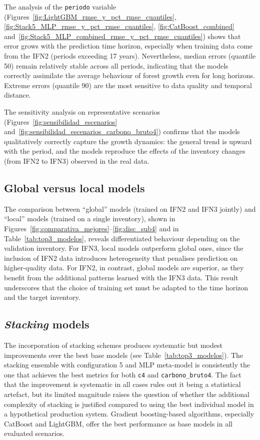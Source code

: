 The analysis of the \texttt{periodo} variable (Figures~\ref{fig:LightGBM_rmse_y_pct_rmse_cuantiles}, \ref{fig:Stack5_MLP_rmse_y_pct_rmse_cuantiles}, \ref{fig:CatBoost_combined} and~\ref{fig:Stack5_MLP_combined_rmse_y_pct_rmse_cuantiles}) shows that error grows with the prediction time horizon, especially when training data come from the IFN2 (periods exceeding 17 years). Nevertheless, median errors (quantile 50) remain relatively stable across all periods, indicating that the models correctly assimilate the average behaviour of forest growth even for long horizons. Extreme errors (quantile 90) are the most sensitive to data quality and temporal distance.

The sensitivity analysis on representative scenarios (Figures~\ref{fig:sensibilidad_escenarios} and~\ref{fig:sensibilidad_escenarios_carbono_bruto4}) confirms that the models qualitatively correctly capture the growth dynamics: the general trend is upward with the period, and the models reproduce the effects of the inventory changes (from IFN2 to IFN3) observed in the real data.

\subsection*{Global versus local models}

The comparison between ``global'' models (trained on IFN2 and IFN3 jointly) and ``local'' models (trained on a single inventory), shown in Figures~\ref{fig:comparativa_mejores}--\ref{fig:disc_sub4} and in Table~\ref{tab:top3_modelos}, reveals differentiated behaviour depending on the validation inventory. For IFN3, local models outperform global ones, since the inclusion of IFN2 data introduces heterogeneity that penalises prediction on higher-quality data. For IFN2, in contrast, global models are superior, as they benefit from the additional patterns learned with the IFN3 data. This result underscores that the choice of training set must be adapted to the time horizon and the target inventory.

\subsection*{\textit{Stacking} models}

The incorporation of stacking schemes produces systematic but modest improvements over the best base models (see Table~\ref{tab:top3_modelos}). The stacking ensemble with configuration 5 and MLP meta-model is consistently the one that achieves the best metrics for both \texttt{c4} and \texttt{carbono\_bruto4}. The fact that the improvement is systematic in all cases rules out it being a statistical artefact, but its limited magnitude raises the question of whether the additional complexity of stacking is justified compared to using the best individual model in a hypothetical production system. Gradient boosting-based algorithms, especially CatBoost and LightGBM, offer the best performance as base models in all evaluated scenarios.

